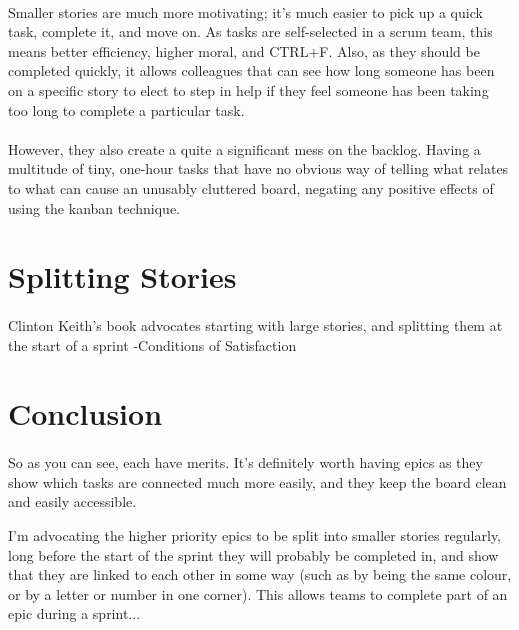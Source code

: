 \documentclass{scrartcl}
\begin{document}
\paragraph{}
Smaller stories are much more motivating; it's much easier to pick up a quick task, complete it, and move on. As tasks are self-selected in a scrum team, this means better efficiency, higher moral, and CTRL+F. Also, as they should be completed quickly, it allows colleagues that can see how long someone has been on a specific story to elect to step in help if they feel someone has been taking too long to complete a particular task\cite{Collab}. %
\paragraph{}
However, they also create a quite a significant mess on the backlog. Having a multitude of tiny, one-hour tasks that have no obvious way of telling what relates to what can cause an unusably cluttered board, negating any positive effects of using the kanban technique.

\section{Splitting Stories}
\paragraph{}
Clinton Keith's book \cite{Keith} advocates starting with large stories, and splitting them at the start of a sprint%
-Conditions of Satisfaction


\section{Conclusion}
\paragraph{}
So as you can see, each have merits. It's definitely worth having epics as they show which tasks are connected much more easily, and they keep the board clean and easily accessible.%

I'm advocating the higher priority epics to be split into smaller stories regularly, long before the start of the sprint they will probably be completed in, and show that they are linked to each other in some way (such as by being the same colour, or by a letter or number in one corner). This allows teams to complete part of an epic during a sprint...%
\end{document}

